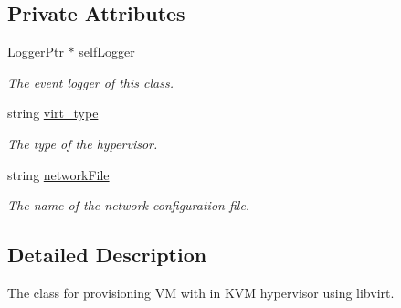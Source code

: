 \subsection*{\-Private \-Attributes}
\begin{DoxyCompactItemize}
\item 
\hypertarget{classKVMWithLibvirt_a823582390a7f121eddb939c29b9fd6df}{\-Logger\-Ptr $\ast$ \hyperlink{classKVMWithLibvirt_a823582390a7f121eddb939c29b9fd6df}{self\-Logger}}\label{classKVMWithLibvirt_a823582390a7f121eddb939c29b9fd6df}

\begin{DoxyCompactList}\small\item\em \-The event logger of this class. \end{DoxyCompactList}\item 
string \hyperlink{classKVMWithLibvirt_a6f19aaec56c4a4e486dfdd8538e37b3a}{virt\-\_\-type}
\begin{DoxyCompactList}\small\item\em \-The type of the hypervisor. \end{DoxyCompactList}\item 
\hypertarget{classKVMWithLibvirt_a917f9a461521a22163ed12a54fbc7c5f}{string \hyperlink{classKVMWithLibvirt_a917f9a461521a22163ed12a54fbc7c5f}{network\-File}}\label{classKVMWithLibvirt_a917f9a461521a22163ed12a54fbc7c5f}

\begin{DoxyCompactList}\small\item\em \-The name of the network configuration file. \end{DoxyCompactList}\end{DoxyCompactItemize}


\subsection{\-Detailed \-Description}
\-The class for provisioning \-V\-M with in \-K\-V\-M hypervisor using libvirt. 

